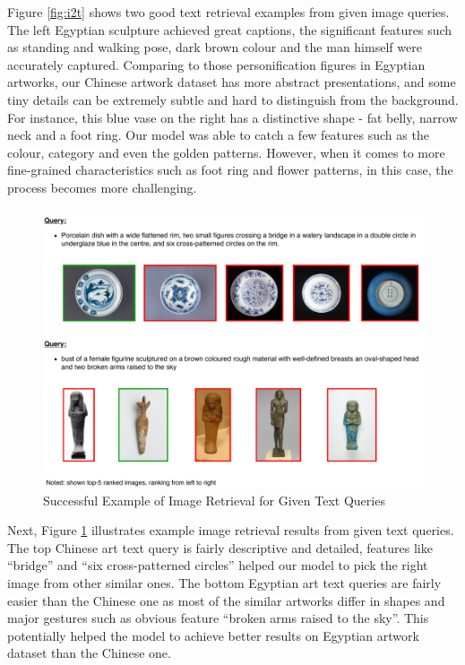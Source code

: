 Figure \ref{fig:i2t} shows two good text retrieval examples from given image queries. The left Egyptian sculpture achieved great captions, the significant features such as standing and walking pose, dark brown colour and the man himself were accurately captured. Comparing to those personification figures in Egyptian artworks, our Chinese artwork dataset has more abstract presentations, and some tiny details can be extremely subtle and hard to distinguish from the background. For instance, this blue vase on the right has a distinctive shape - fat belly, narrow neck and a foot ring. Our model was able to catch a few features such as the colour, category and even the golden patterns. However, when it comes to more fine-grained characteristics such as foot ring and flower patterns, in this case, the process becomes more challenging.

\begin{figure}[h!]
\centering
\includegraphics[width=\textwidth]{t2i.pdf}
\caption{Successful Example of Image Retrieval for Given Text Queries
}
\label{fig:t2i}
\end{figure}

Next, Figure \ref{fig:t2i} illustrates example image retrieval results from given text queries. The top Chinese art text query is fairly descriptive and detailed, features like ``bridge'' and ``six cross-patterned circles'' helped our model to pick the right image from other similar ones. The bottom Egyptian art text queries are fairly easier than the Chinese one as most of the similar artworks differ in shapes and major gestures such as obvious feature ``broken arms raised to the sky''. This potentially helped the model to achieve better results on Egyptian artwork dataset than the Chinese one.



